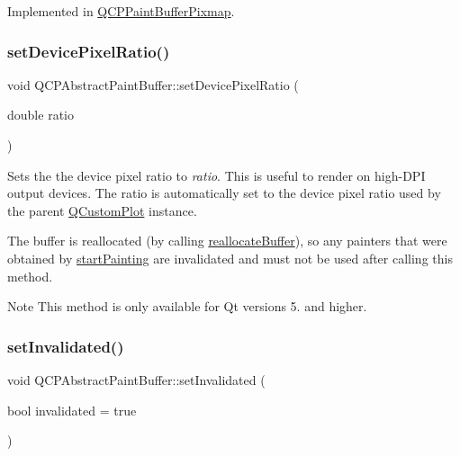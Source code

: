 Implemented in \hyperlink{class_q_c_p_paint_buffer_pixmap_ad49f3205ba3463b1c44f8db3cfcc90f0}{Q\+C\+P\+Paint\+Buffer\+Pixmap}.

\mbox{\label{class_q_c_p_abstract_paint_buffer_a555eaad5d5c806420ff35602a1bb68fa}} 
\subsubsection{\texorpdfstring{set\+Device\+Pixel\+Ratio()}{setDevicePixelRatio()}}
{\footnotesize\ttfamily void Q\+C\+P\+Abstract\+Paint\+Buffer\+::set\+Device\+Pixel\+Ratio (\begin{DoxyParamCaption}\item[{double}]{ratio }\end{DoxyParamCaption})}

Sets the the device pixel ratio to {\itshape ratio}. This is useful to render on high-\/\+D\+PI output devices. The ratio is automatically set to the device pixel ratio used by the parent \hyperlink{class_q_custom_plot}{Q\+Custom\+Plot} instance.

The buffer is reallocated (by calling \hyperlink{class_q_c_p_abstract_paint_buffer_aee7506a52bd7e5a07c2af27935eb13e7}{reallocate\+Buffer}), so any painters that were obtained by \hyperlink{class_q_c_p_abstract_paint_buffer_a9e9f29b19c033cf02fb96f1a148463f3}{start\+Painting} are invalidated and must not be used after calling this method.

\begin{DoxyNote}{Note}
This method is only available for Qt versions 5. and higher. 
\end{DoxyNote}
\mbox{\label{class_q_c_p_abstract_paint_buffer_ae4c7dc70dfc66be2879ce297b2b3d67f}} 
\subsubsection{\texorpdfstring{set\+Invalidated()}{setInvalidated()}}
{\footnotesize\ttfamily void Q\+C\+P\+Abstract\+Paint\+Buffer\+::set\+Invalidated (\begin{DoxyParamCaption}\item[{bool}]{invalidated = {\ttfamily true} }\end{DoxyParamCaption})}

